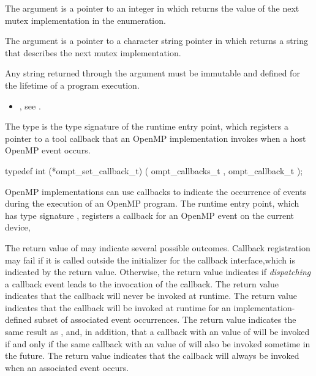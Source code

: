 The  argument is a pointer to an integer in which 
 returns the value of the next mutex 
implementation in the enumeration.

The  argument is a pointer to a character string pointer
in which  returns a string that describes
the next mutex implementation.

\constraints
Any string returned through the  argument must be 
immutable and defined for the lifetime of a program execution.

\crossreferences
\begin{itemize}
\item {}, see .
\end{itemize}



\label{sec:ompt_set_callback_t}
\label{sec:ompt_set_callback}

\summary
The  type is the type signature of the 
 runtime entry point, which registers a
pointer to a tool callback that an OpenMP implementation invokes 
when a host OpenMP event occurs.

\format
\begin{ccppspecific}
\begin{omptCallback}
typedef int (*ompt_set_callback_t) (
  ompt_callbacks_t ,
  ompt_callback_t 
);
\end{omptCallback}
\end{ccppspecific}

\descr
OpenMP implementations can use callbacks to indicate the occurrence of events 
during the execution of an OpenMP program. The  runtime
entry point, which has type signature , registers a 
callback for an OpenMP event on the current device,

The return value of  may indicate several possible 
outcomes. Callback registration may fail if it is called outside the initializer 
for the callback interface,which is indicated by the  return 
value. Otherwise, the return value indicates if \emph{dispatching} a callback 
event leads to the invocation of the callback. The  return 
value indicates that the callback will never be invoked at runtime. The 
 return value indicates that the callback will be 
invoked at runtime for an implementation-defined subset of associated event 
occurrences. The  return value indicates the 
same result as , and, in addition, that a callback
with an  value of  will be invoked if 
and only if the same callback with an  value of  
will also be invoked sometime in the future. The  return 
value indicates that the callback will always be invoked when an associated 
event occurs.

